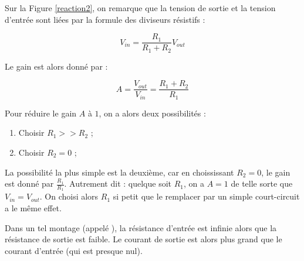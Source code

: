 Sur la Figure \ref{reaction2}, on remarque que la tension de sortie et la tension d'entrée sont liées par la formule des diviseurs résistifs :

$$V_{in} = \frac{R_1}{R_1 + R_2} V_{out}$$

Le gain est alors donné par :

$$A = \frac{V_{out}}{V_{in}} = \frac{R_1 + R_2}{R_1}$$

Pour réduire le gain $A$ à $1$, on a alors deux possibilités :

\begin{enumerate}
	\item	Choisir $R_1 >> R_2$ ;
	\item Choisir $R_2 = 0$ ;
\end{enumerate}

La possibilité la plus simple est la deuxième, car en choississant $R_2 = 0$, le gain est donné par $\frac{R_1}{R_1}$. Autrement dit : quelque soit $R_1$, on a $A = 1$ de telle sorte que $V_{in} = V_{out}$. On choisi alors $R_1$ si petit que le remplacer par un simple court-circuit a le même effet.

Dans un tel montage (appelé ), la résistance d'entrée est infinie alors que la résistance de sortie est faible. Le courant de sortie est alors plus grand que le courant d'entrée (qui est presque nul).

\nocite{*} 




